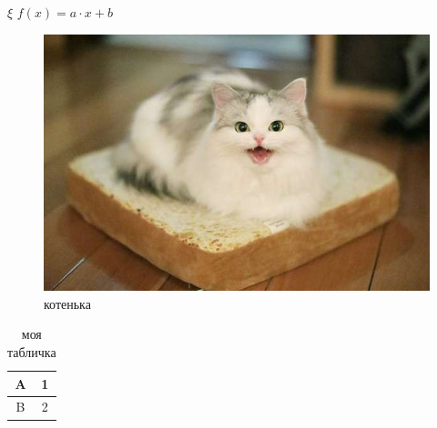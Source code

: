 \documentclass{article}
\begin{document}
$\xi$
    $f(x)=a\cdot x + b$
\begin{figure}
    \centering
    \includegraphics{cat.jpg}
    \caption{котенька}
    \label{fig:my_label}
\end{figure}

\begin{table}[h!]
    \centering
    \begin{tabular}{|c|c|}
        \hline
       A  & 1 \\ \hline
       B  & 2 \\ \hline
    \end{tabular}
    \caption{моя табличка}
    \label{tab:my_label}
\end{table}
\end{document}
